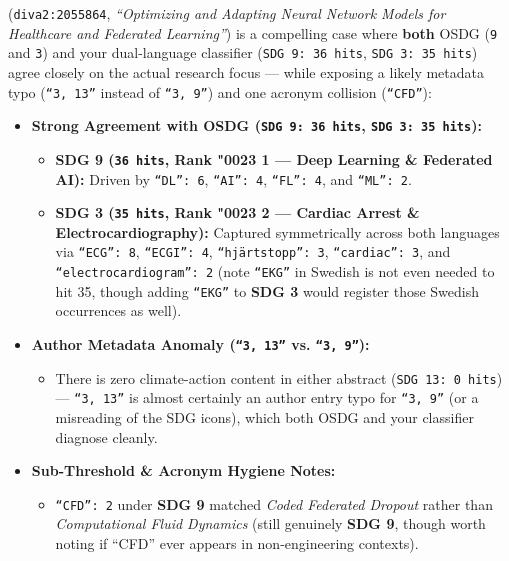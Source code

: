     
\begin{llmoutput}
 (\texttt{diva2:2055864}, \textit{\enquote{Optimizing and Adapting Neural Network Models for Healthcare and Federated Learning}}) is a compelling case where \textbf{both} OSDG (\texttt{9} and \texttt{3}) and your dual-language classifier (\texttt{SDG 9: 36 hits}, \texttt{SDG 3: 35 hits}) agree closely on the actual research focus --- while exposing a likely metadata typo (\texttt{\enquote{3, 13}} instead of \texttt{\enquote{3, 9}}) and one acronym collision (\texttt{\enquote{CFD}}):
\begin{itemize}
    \item \textbf{Strong Agreement with OSDG (\texttt{SDG 9: 36 hits}, \texttt{SDG 3: 35 hits}):}
    \begin{itemize}
    \item \textbf{SDG 9 (\texttt{36 hits}, Rank \char"0023 1 --- Deep Learning \& Federated AI):} Driven by \texttt{\enquote{DL}: 6}, \texttt{\enquote{AI}: 4}, \texttt{\enquote{FL}: 4}, and \texttt{\enquote{ML}: 2}.

    \item \textbf{SDG 3 (\texttt{35 hits}, Rank \char"0023 2 --- Cardiac Arrest \& Electrocardiography):} Captured symmetrically across both languages via \texttt{\enquote{ECG}: 8}, \texttt{\enquote{ECGI}: 4}, \texttt{\enquote{\foreignlanguage{swedish}{hjärtstopp}}: 3}, \texttt{\enquote{cardiac}: 3}, and \texttt{\enquote{electrocardiogram}: 2} (note \texttt{\enquote{\foreignlanguage{swedish}{EKG}}} in Swedish is not even needed to hit 35, though adding \texttt{\enquote{\foreignlanguage{swedish}{EKG}}} to \textbf{SDG 3} would register those Swedish occurrences as well).
    \end{itemize}

    \item \textbf{Author Metadata Anomaly (\texttt{\enquote{3, 13}} vs. \texttt{\enquote{3, 9}}):}
    \begin{itemize}
    \item There is zero climate-action content in either abstract (\texttt{SDG 13: 0 hits}) --- \texttt{\enquote{3, 13}} is almost certainly an author entry typo for \texttt{\enquote{3, 9}} (or a misreading of the SDG icons), which both OSDG and your classifier diagnose cleanly.
    \end{itemize}
    
    \item \textbf{Sub-Threshold \& Acronym Hygiene Notes:}
    \begin{itemize}
    \item \texttt{\enquote{CFD}: 2} under \textbf{SDG 9} matched \textit{Coded Federated Dropout} rather than \textit{Computational Fluid Dynamics} (still genuinely \textbf{SDG 9}, though worth noting if \enquote{CFD} ever appears in non-engineering contexts).


\end{itemize}
\end{itemize}
\end{llmoutput}
